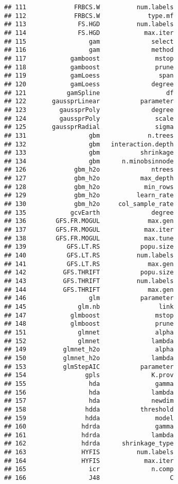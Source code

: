 \documentclass[
]{article}
\begin{document}
\begin{verbatim}
## 111             FRBCS.W          num.labels
## 112             FRBCS.W             type.mf
## 113              FS.HGD          num.labels
## 114              FS.HGD            max.iter
## 115                 gam              select
## 116                 gam              method
## 117            gamboost               mstop
## 118            gamboost               prune
## 119            gamLoess                span
## 120            gamLoess              degree
## 121           gamSpline                  df
## 122       gaussprLinear           parameter
## 123         gaussprPoly              degree
## 124         gaussprPoly               scale
## 125       gaussprRadial               sigma
## 131                 gbm             n.trees
## 132                 gbm   interaction.depth
## 133                 gbm           shrinkage
## 134                 gbm      n.minobsinnode
## 126             gbm_h2o              ntrees
## 127             gbm_h2o           max_depth
## 128             gbm_h2o            min_rows
## 129             gbm_h2o          learn_rate
## 130             gbm_h2o     col_sample_rate
## 135            gcvEarth              degree
## 136        GFS.FR.MOGUL             max.gen
## 137        GFS.FR.MOGUL            max.iter
## 138        GFS.FR.MOGUL            max.tune
## 139           GFS.LT.RS           popu.size
## 140           GFS.LT.RS          num.labels
## 141           GFS.LT.RS             max.gen
## 142          GFS.THRIFT           popu.size
## 143          GFS.THRIFT          num.labels
## 144          GFS.THRIFT             max.gen
## 146                 glm           parameter
## 145              glm.nb                link
## 147            glmboost               mstop
## 148            glmboost               prune
## 151              glmnet               alpha
## 152              glmnet              lambda
## 149          glmnet_h2o               alpha
## 150          glmnet_h2o              lambda
## 153          glmStepAIC           parameter
## 154                gpls              K.prov
## 155                 hda               gamma
## 156                 hda              lambda
## 157                 hda              newdim
## 158                hdda           threshold
## 159                hdda               model
## 160               hdrda               gamma
## 161               hdrda              lambda
## 162               hdrda      shrinkage_type
## 163               HYFIS          num.labels
## 164               HYFIS            max.iter
## 165                 icr              n.comp
## 166                 J48                   C

\end{verbatim}
\end{document}
